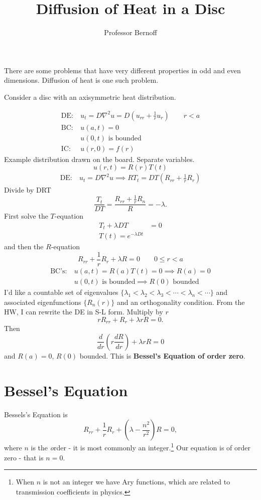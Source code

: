 \documentclass[cm]{article}
\title{Diffusion of Heat in a Disc}
\author{Professor Bernoff}
\begin{document}
\maketitle
There are some problems that have very different properties in odd and even
dimensions. Diffusion of heat is one such problem.

Consider a disc with an axisymmetric heat distribution.

\begin{align*}
\text{DE:}&~ u_t = D\nabla^2u = D(u_{rr} + \frac{1}{r} u_r) \qquad r < a \\
\text{BC:}&~ u(a,t) = 0 \\
    &~ u(0,t) \text{ is bounded} \\
\text{IC:}&~u(r,0) = f(r)
\end{align*}
Example distribution drawn on the board. Separate variables.
$$u(r,t) = R(r)T(t)$$
\begin{align*}
\text{DE}:&~ u_t = D \nabla^2 u \implies RT_t = DT(R_{rr} + \frac{1}{r} R_r)
\end{align*}
Divide by DRT
$$\frac{T_t}{DT} = \frac{R_{rr} + \frac{1}{r} R_n}{R} = - \lambda.$$
First solve the $T$-equation
\begin{align*}
T_t + \lambda D T &= 0 \\
T(t) = e^{-\lambda  D t}
\end{align*}
and then the $R$-equation
$$R_{rr} + \frac{1}{r} R_r + \lambda R = 0 \qquad 0 \leq r < a$$
\begin{align*}
\text{BC's:}&~ u(a,t) = R(a)T(t) = 0 \implies R(a) = 0 \\
        &~ u(0,t) \text{ is bounded} \implies \text{$R(0)$ bounded}
\end{align*}
I'd like a countable set of eigenvalues $\{ \lambda_1 < \lambda_2 < \lambda_3 < \cdots < \lambda_n < \cdots \}$ and associated eigenfunctions $\{R_n(r)\}$ and an
orthogonality condition. From the HW, I can rewrite the DE in S-L form. Multiply
by $r$
$$rR_{rr} + R_r + \lambda rR = 0.$$
Then
$$\frac{d}{dr} \left( r \frac{dR}{dr}\right) + \lambda r R = 0$$
and $R(a) = 0$, $R(0)$ bounded. This is {\bf Bessel's Equation of order zero}.

\section{Bessel's Equation}
Bessels's Equation is 
$$R_{rr} + \frac{1}{r} R_r + (\lambda - \frac{n^2}{r^2})R = 0,$$
where $n$ is the {\emph order} - it is most commonly an integer.\footnote{When
$n$ is not an integer we have Ary functions, which are related to
transmission coefficients in physics.} Our equation is of order zero -
that is $n = 0$.
\end{document}
